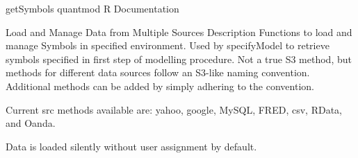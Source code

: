 getSymbols {quantmod} R Documentation 

Load and Manage Data from Multiple Sources
Description
Functions to load and manage Symbols in specified environment. Used by specifyModel to retrieve symbols specified in first step of modelling procedure. Not a true S3 method, but methods for different data sources follow an S3-like naming convention. Additional methods can be added by simply adhering to the convention. 

Current src methods available are: yahoo, google, MySQL, FRED, csv, RData, and Oanda. 

Data is loaded silently without user assignment by default. 

